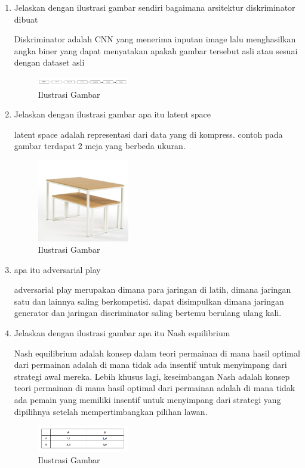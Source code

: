 \begin{enumerate}
            \item Jelaskan dengan ilustrasi gambar sendiri bagaimana arsitektur diskriminator dibuat
            \par Diskriminator adalah CNN yang menerima inputan image lalu menghasilkan angka biner yang dapat menyatakan apakah gambar tersebut asli atau sesuai dengan dataset asli
            \begin{figure}[H]
                \includegraphics[width=4cm]{figures/1174057/chapter8/teori4.png}
                \centering
                  \caption{Ilustrasi Gambar}
            \end{figure}

            \item Jelaskan dengan ilustrasi gambar apa itu latent space
            \par latent space adalah representasi dari data yang di kompress. contoh pada gambar terdapat 2 meja yang berbeda ukuran.
            \begin{figure}[H]
                \includegraphics[width=4cm]{figures/1174057/chapter8/teori5.png}
                \centering
                  \caption{Ilustrasi Gambar}
            \end{figure}

            \item apa itu adversarial play
            \par adversarial play merupakan dimana para jaringan di latih, dimana jaringan satu dan lainnya saling berkompetisi. dapat disimpulkan dimana jaringan generator dan jaringan discriminator saling bertemu berulang ulang kali.
            
            \item Jelaskan dengan ilustrasi gambar apa itu Nash equilibrium
            \par Nash equilibrium adalah konsep dalam teori permainan di mana hasil optimal dari permainan adalah di mana tidak ada insentif untuk menyimpang dari strategi awal mereka. Lebih khusus lagi, keseimbangan Nash adalah konsep teori permainan di mana hasil optimal dari permainan adalah di mana tidak ada pemain yang memiliki insentif untuk menyimpang dari strategi yang dipilihnya setelah mempertimbangkan pilihan lawan.
            \begin{figure}[H]
                \includegraphics[width=4cm]{figures/1174057/chapter8/teori7.png}
                \centering
                  \caption{Ilustrasi Gambar}
            \end{figure}


\end{enumerate}
